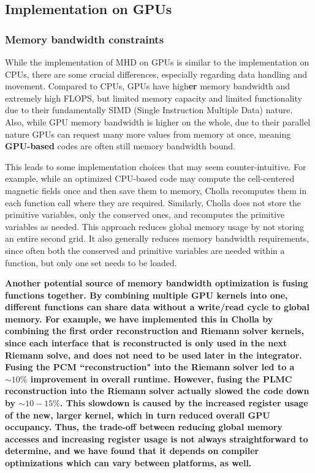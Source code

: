 \documentclass[modern, linenumbers]{aastex631}
\begin{document}
\subsection{Implementation on GPUs}
\label{sec:gpu-vs-cpu}

\subsubsection{Memory bandwidth constraints}
While the implementation of MHD on GPUs is similar to the implementation on CPUs, there are some crucial differences, especially regarding data handling and movement. Compared to CPUs, GPUs have high\textbf{er} memory bandwidth and extremely high FLOPS, but limited memory capacity and limited functionality due to their fundamentally SIMD (Single Instruction Multiple Data) nature. Also, while GPU memory bandwidth is higher on the whole, due to their parallel nature GPUs can request many more values from memory at once, meaning \textbf{GPU-based} codes are often still memory bandwidth bound.

This leads to some implementation choices that may seem counter-intuitive. For example, while an optimized CPU-based code may compute the cell-centered magnetic fields once and then save them to memory, Cholla recomputes them in each function call where they are required. Similarly, Cholla does not store the primitive variables, only the conserved ones, and recomputes the primitive variables as needed. This approach reduces global memory usage by not storing an entire second grid. It also generally reduces memory bandwidth requirements, since often both the conserved and primitive variables are needed within a function, but only one set needs to be loaded.

\textbf{Another potential source of memory bandwidth optimization is fusing functions together. By combining multiple GPU kernels into one, different functions can share data without a write/read cycle to global memory. For example, we have implemented this in Cholla by combining the first order reconstruction and Riemann solver kernels, since each interface that is reconstructed is only used in the next Riemann solve, and does not need to be used later in the integrator. Fusing the PCM ``reconstruction" into the Riemann solver led to a $\sim 10\%$ improvement in overall runtime. However, fusing the PLMC reconstruction into the Riemann solver actually slowed the code down by $\sim 10-15\%$. This slowdown is caused by the increased register usage of the new, larger kernel, which in turn reduced overall GPU occupancy. Thus, the trade-off between reducing global memory accesses and increasing register usage is not always straightforward to determine, and we have found that it depends on compiler optimizations which can vary between platforms, as well.}
\end{document}
